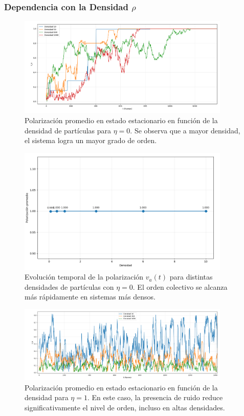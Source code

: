 \documentclass{article}
\begin{document}
\subsubsection{Dependencia con la Densidad $\rho$}

\begin{figure}[H]
\centering
\includegraphics[width=0.9\textwidth]{Voter Ruido 0 variando densidad.png}
\caption{Polarización promedio en estado estacionario en función de la densidad de partículas para $\eta = 0$. Se observa que a mayor densidad, el sistema logra un mayor grado de orden.}
\label{fig:promedio_va_densidad_voter0}
\end{figure}

\begin{figure}[H]
\centering
\includegraphics[width=0.9\textwidth]{Voter Ruido 0 variando densidad avg.png}
\caption{Evolución temporal de la polarización $v_a(t)$ para distintas densidades de partículas con $\eta = 0$. El orden colectivo se alcanza más rápidamente en sistemas más densos.}
\label{fig:va_tiempo_densidad_voter0}
\end{figure}

\begin{figure}[H]
\centering
\includegraphics[width=0.9\textwidth]{Voter Ruido 1 variando densidad.png}
\caption{Polarización promedio en estado estacionario en función de la densidad para $\eta = 1$. En este caso, la presencia de ruido reduce significativamente el nivel de orden, incluso en altas densidades.}
\label{fig:promedio_va_densidad_voter1}
\end{figure}
\end{document}
